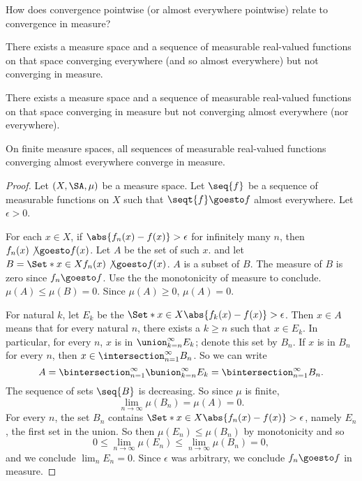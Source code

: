 

How does convergence pointwise
(or almost everywhere pointwise)
relate to convergence in measure?


\begin{prop}
  There exists
  a measure space
  and a sequence of
  measurable
  real-valued functions
  on that space
  converging everywhere
  (and so almost everywhere)
  but not converging
  in measure.
\end{prop}

\begin{prop}
  There exists
  a measure space
  and a sequence of
  measurable
  real-valued functions
  on that space
  converging in measure
  but not converging almost
  everywhere (nor everywhere).
\end{prop}

\begin{prop}
On finite measure spaces,
all sequences of measurable
real-valued functions
converging almost
everywhere converge in
measure.

\begin{proof}

Let $(X, \SA, \mu)$
be a measure space.
Let $\seq{f}$ be a sequence
of measurable functions on $X$
such that $\seqt{f} \goesto f$
almost everywhere.
Let $\epsilon > 0$.

For each $x \in X$, if
$\abs{f_n(x) - f(x)} > \epsilon$
for infinitely many $n$,
then $f_n(x) \not\goesto f(x)$.
Let $A$ be the set of such $x$.
and let $B =
\Set*{
x \in X
}{
f_n(x) \not\goesto f(x)
}$.
$A$ is a subset
of $B$.
The measure of $B$
is zero
since $f_n \goesto f$.
Use the the monotonicity
of measure to conclude.
$\mu(A) \leq \mu(B) = 0$.
Since $\mu(A) \geq 0$,
$\mu(A) = 0$.

For natural
$k$, let $E_k$
be the
$\Set*{x \in X}
{\abs{f_k(x) - f(x)} > \epsilon}$.
Then $x \in A$ means that
for every natural $n$, there exists
a $k \geq n$ such that $x \in E_k$.
In particular, for every $n$,
$x$ is in $\union_{k = n}^{\infty}E_k$;
denote this set by $B_n$.
If $x$ is in $B_n$ for every
$n$, then
$x \in \intersection_{n = 1}^{\infty} B_n$.
So we can write
\[
  A = \bintersection_{n = 1}^{\infty}
  \bunion_{k = n}^{\infty}
  E_k
  = \bintersection_{n = 1}^{\infty}
  B_n
  .
\]
The sequence of sets $\seq{B}$
is decreasing. So since $\mu$ is finite,
\[
  \lim_{n \to \infty} \mu(B_n) = \mu(A) = 0.
\]
For every $n$, the set $B_n$ contains
$\Set*{x \in X}{\abs{f_n(x) - f(x)} >
\epsilon}$,
namely $E_n$, the first
set in the union.
So then $\mu(E_n) \leq \mu(B_n)$
by monotonicity and so
\[
  0
  \leq \lim_{n \to \infty} \mu(E_n)
  \leq \lim_{n \to \infty} \mu(B_n)
  = 0,
\]
and we conclude $\lim_{n} E_n = 0$.
Since $\epsilon$ was arbitrary,
we conclude $f_n \goesto f$ in
measure.

\end{proof}

\end{prop}


